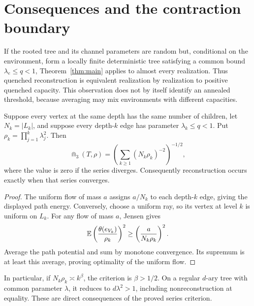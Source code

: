 \section{Consequences and the contraction boundary}

\begin{remark}
If the rooted tree and its channel parameters are random but, conditional on
the environment, form a locally finite deterministic tree satisfying a common
bound $\lambda_e\le q<1$, Theorem~\ref{thm:main} applies to almost every
realization. Thus quenched reconstruction is equivalent realization by
realization to positive quenched capacity. This observation does not by itself
identify an annealed threshold, because averaging may mix environments with
different capacities.
\end{remark}

\begin{corollary}\label{cor:spherical}
Suppose every vertex at the same depth has the same number of children,
let $N_k=|L_k|$, and suppose every depth-$k$ edge has parameter
$\lambda_k\le q<1$. Put $\rho_k=\prod_{j=1}^k\lambda_j^2$.
Then
\[
\Cap_3(T,\rho)=
\left(\sum_{k\ge1}(N_k\rho_k)^{-2}\right)^{-1/2},
\]
where the value is zero if the series diverges. Consequently reconstruction
occurs exactly when that series converges.
\end{corollary}

\begin{proof}
The uniform flow of mass $a$ assigns $a/N_k$ to each depth-$k$ edge,
giving the displayed path energy. Conversely, choose a uniform ray,
so its vertex at level $k$ is uniform on $L_k$. For any flow of mass
$a$, Jensen gives
\[
\mathbb E\left(\frac{\theta(e_{V_k})}{\rho_k}\right)^2
\ge\left(\frac{a}{N_k\rho_k}\right)^2.
\]
Average the path potential and sum by monotone convergence. Its supremum
is at least this average, proving optimality of the uniform flow.
\end{proof}

In particular, if $N_k\rho_k\asymp k^\beta$, the criterion is
$\beta>1/2$. On a regular $d$-ary tree with common parameter $\lambda$,
it reduces to $d\lambda^2>1$, including nonreconstruction at equality.
These are direct consequences of the proved series criterion.


